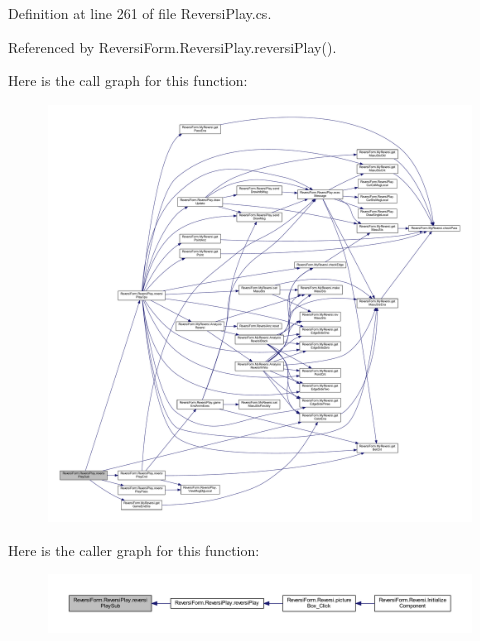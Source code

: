 Definition at line 261 of file Reversi\+Play.\+cs.



Referenced by Reversi\+Form.\+Reversi\+Play.\+reversi\+Play().

Here is the call graph for this function\+:\nopagebreak
\begin{figure}[H]
\begin{center}
\leavevmode
\includegraphics[width=350pt]{class_reversi_form_1_1_reversi_play_a4fe42268a8d957c555db025f8b35d34e_cgraph}
\end{center}
\end{figure}
Here is the caller graph for this function\+:\nopagebreak
\begin{figure}[H]
\begin{center}
\leavevmode
\includegraphics[width=350pt]{class_reversi_form_1_1_reversi_play_a4fe42268a8d957c555db025f8b35d34e_icgraph}
\end{center}
\end{figure}
\mbox{\label{class_reversi_form_1_1_reversi_play_a08062d3bd42d1780a6931b44a925503d}} 
